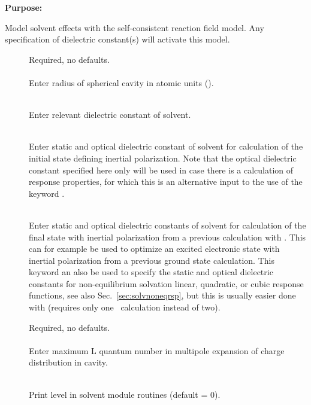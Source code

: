 {\bf Purpose:}

Model solvent effects with the self-consistent
reaction field model.
Any specification of dielectric constant(s)
will activate this model.

\begin{description}
\item[]
  Required, no defaults.\\
  \\
  Enter radius of spherical cavity in atomic units (\bohr{}).

\item[]
  \\
  Enter relevant dielectric constant of solvent.

\item[]
  \\
  Enter static and optical dielectric constant of solvent for calculation
  of the initial state defining inertial polarization. Note that the optical dielectric constant specified here
  only will be used in case there is a calculation of response
  properties, for which this is an alternative input to the use of the
  keyword .

\item[]
  \\
  Enter static and optical dielectric constants of solvent
  for calculation of the final state with inertial polarization
  from a previous calculation with . 
  This can for example be used to optimize an excited electronic state
  with inertial polarization from a previous ground state calculation.
  This keyword an  also be used to specify the static and optical dielectric constants
  for non-equilibrium solvation linear, quadratic, or cubic response functions,
  see also Sec.~\ref{sec:solvnoneqrsp}, but this is usually easier done with
   (requires only one \dalton\ calculation instead of two).

\item[]
  Required, no defaults.\\
  \\
  Enter maximum L quantum number in multipole expansion of charge
  distribution in cavity.

\item[]
   \\
  Print level in solvent module routines (default = 0).
\end{description}

